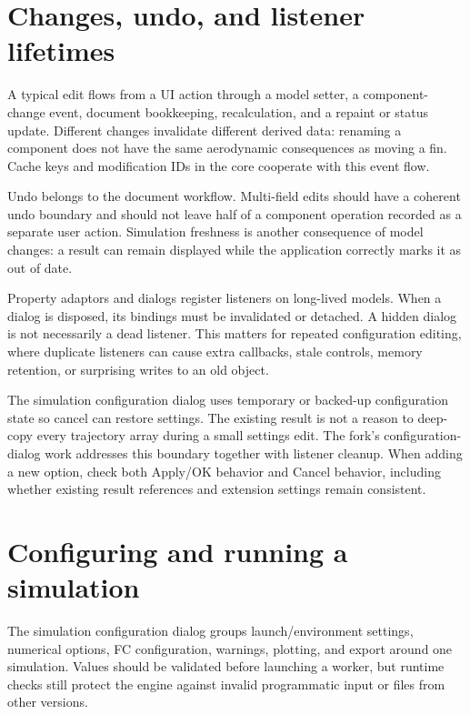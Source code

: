 
\section{Changes, undo, and listener lifetimes}
A typical edit flows from a UI action through a model setter, a component-change event, document bookkeeping, recalculation, and a repaint or status update. Different changes invalidate different derived data: renaming a component does not have the same aerodynamic consequences as moving a fin. Cache keys and modification IDs in the core cooperate with this event flow.

Undo belongs to the document workflow. Multi-field edits should have a coherent undo boundary and should not leave half of a component operation recorded as a separate user action. Simulation freshness is another consequence of model changes: a result can remain displayed while the application correctly marks it as out of date.

Property adaptors and dialogs register listeners on long-lived models. When a dialog is disposed, its bindings must be invalidated or detached. A hidden dialog is not necessarily a dead listener. This matters for repeated configuration editing, where duplicate listeners can cause extra callbacks, stale controls, memory retention, or surprising writes to an old object.

The simulation configuration dialog uses temporary or backed-up configuration state so cancel can restore settings. The existing result is not a reason to deep-copy every trajectory array during a small settings edit. The fork's configuration-dialog work addresses this boundary together with listener cleanup. When adding a new option, check both Apply/OK behavior and Cancel behavior, including whether existing result references and extension settings remain consistent.

\section{Configuring and running a simulation}
The simulation configuration dialog groups launch/environment settings, numerical options, FC configuration, warnings, plotting, and export around one simulation. Values should be validated before launching a worker, but runtime checks still protect the engine against invalid programmatic input or files from other versions.

